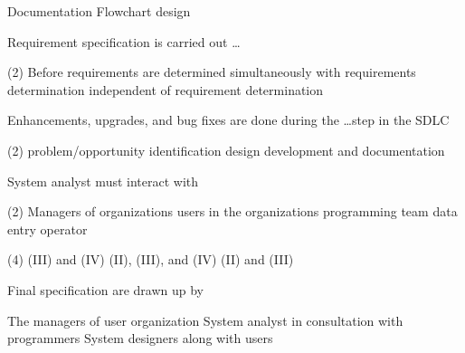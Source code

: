 \documentclass[10pt]{article}
\begin{document}
\begin{questions}
\begin{exercise}
\begin{choice}
            \choice Documentation
            \choice Flowchart
            \choice {}
            \choice design
        \end{choice}
    \end{exercise}
    \begin{exercise}
        Requirement specification is carried out \dots
        \begin{choice}(2)
            \choice {}
            \choice Before requirements are determined
            \choice simultaneously with requirements determination
            \choice independent of requirement determination
        \end{choice}
    \end{exercise}
    \begin{exercise}
        Enhancements, upgrades, and bug fixes are done during the \dots step in the SDLC
        \begin{choice}(2)
            \choice {}
            \choice problem/opportunity identification
            \choice design
            \choice development and documentation
        \end{choice}
    \end{exercise}
    \begin{exercise}
        System analyst must interact with
        \begin{tasks}(2)
            \task Managers of organizations
            \task users in the organizations
            \task programming team
            \task data entry operator
        \end{tasks}
        \begin{choice}(4)
            \choice (III) and (IV)
            \choice {}
            \choice (II), (III), and (IV)
            \choice (II) and (III)
        \end{choice}
    \end{exercise}
    \begin{exercise}
        Final specification are drawn up by
        \begin{choice}
            \choice {}
            \choice The managers of user organization
            \choice System analyst in consultation with programmers
            \choice System designers along with users
        \end{choice}
    \end{exercise}

\end{questions}
\end{document}
